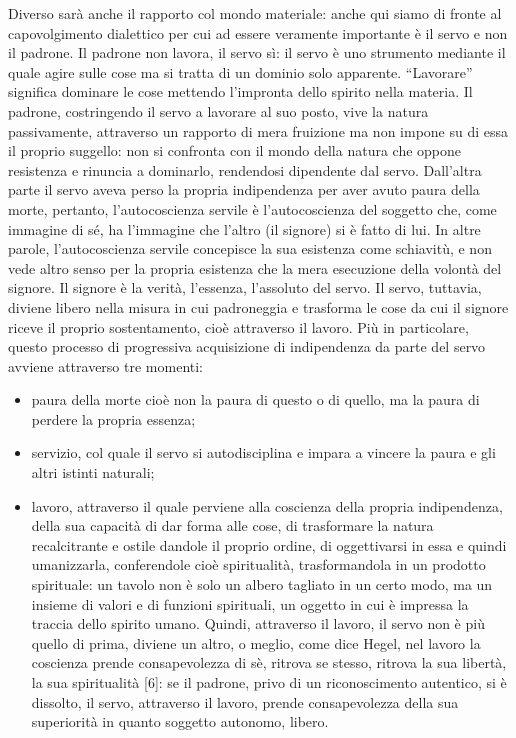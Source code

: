 \documentclass[a4paper,12pt,oneside,openany]{book}%
\begin{document}
	Diverso sarà anche il rapporto col mondo materiale: anche qui siamo di fronte al capovolgimento dialettico per cui ad essere veramente importante è il servo e non il padrone.  Il padrone non lavora, il servo sì: il servo è uno strumento mediante il quale agire sulle cose ma si tratta di un dominio solo apparente. “Lavorare” significa dominare le cose mettendo l’impronta dello spirito nella materia. Il padrone, costringendo il servo a lavorare al suo posto, vive la natura passivamente, attraverso un rapporto di mera fruizione ma non impone su di essa il proprio suggello: non si confronta con il mondo della natura che oppone resistenza e rinuncia a dominarlo, rendendosi dipendente dal servo.  Dall’altra parte il servo aveva perso la propria indipendenza per aver avuto paura della morte, pertanto, l’autocoscienza servile è l’autocoscienza del soggetto che, come immagine di sé, ha l’immagine che l’altro (il signore) si è fatto di lui. In altre parole, l’autocoscienza servile concepisce la sua esistenza come schiavitù, e non vede altro senso per la propria esistenza che la mera esecuzione della volontà del signore. Il signore è la verità, l’essenza, l’assoluto del servo. Il servo, tuttavia, diviene libero nella misura in cui padroneggia e trasforma le cose da cui il signore riceve il proprio sostentamento, cioè attraverso il lavoro. Più in particolare, questo processo di progressiva acquisizione di indipendenza da parte del servo avviene attraverso tre momenti:
	
\begin{itemize}
	\item paura della morte cioè non la paura di questo o di quello, ma la paura di perdere la propria essenza;
	\item servizio, col quale il servo si autodisciplina e impara a vincere la paura e gli altri istinti naturali;
	\item lavoro, attraverso il quale perviene alla coscienza della propria indipendenza, della sua capacità di dar forma alle cose, di trasformare la natura recalcitrante e ostile dandole il proprio ordine, di oggettivarsi in essa e quindi umanizzarla, conferendole cioè spiritualità, trasformandola in un prodotto spirituale: un tavolo non è solo un albero tagliato in un certo modo, ma un insieme di valori e di funzioni spirituali, un oggetto in cui è impressa la traccia dello spirito umano. Quindi, attraverso il lavoro, il servo non è più quello di prima, diviene un altro, o meglio, come dice Hegel, nel lavoro la coscienza prende consapevolezza di sè, ritrova se stesso, ritrova la sua libertà, la sua spiritualità [6]: se il padrone, privo di un riconoscimento autentico, si è dissolto, il servo, attraverso il lavoro, prende consapevolezza della sua superiorità in quanto soggetto autonomo, libero.
\end{itemize}	
	
\end{document}
